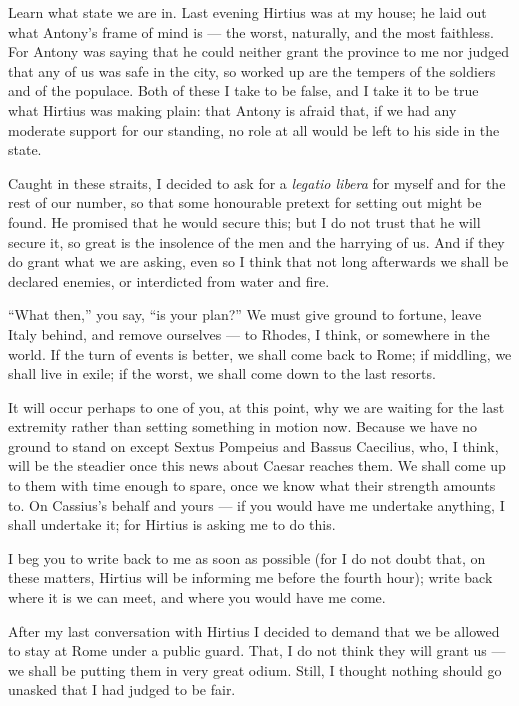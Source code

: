 

 Learn what state we are in. Last evening Hirtius was at my house; he laid out what Antony's frame of mind is --- the worst, naturally, and the most faithless. For Antony was saying that he could neither grant the province to me nor judged that any of us was safe in the city, so worked up are the tempers of the soldiers and of the populace. Both of these I take to be false, and I take it to be true what Hirtius was making plain: that Antony is afraid that, if we had any moderate support for our standing, no role at all would be left to his side in the state.

 Caught in these straits, I decided to ask for a \textit{legatio libera} for myself and for the rest of our number, so that some honourable pretext for setting out might be found. He promised that he would secure this; but I do not trust that he will secure it, so great is the insolence of the men and the harrying of us. And if they do grant what we are asking, even so I think that not long afterwards we shall be declared enemies, or interdicted from water and fire.

 ``What then,'' you say, ``is your plan?'' We must give ground to fortune, leave Italy behind, and remove ourselves --- to Rhodes, I think, or somewhere in the world. If the turn of events is better, we shall come back to Rome; if middling, we shall live in exile; if the worst, we shall come down to the last resorts.

 It will occur perhaps to one of you, at this point, why we are waiting for the last extremity rather than setting something in motion now. Because we have no ground to stand on except Sextus Pompeius and Bassus Caecilius, who, I think, will be the steadier once this news about Caesar reaches them. We shall come up to them with time enough to spare, once we know what their strength amounts to. On Cassius's behalf and yours --- if you would have me undertake anything, I shall undertake it; for Hirtius is asking me to do this.

 I beg you to write back to me as soon as possible (for I do not doubt that, on these matters, Hirtius will be informing me before the fourth hour); write back where it is we can meet, and where you would have me come.

 After my last conversation with Hirtius I decided to demand that we be allowed to stay at Rome under a public guard. That, I do not think they will grant us --- we shall be putting them in very great odium. Still, I thought nothing should go unasked that I had judged to be fair.
